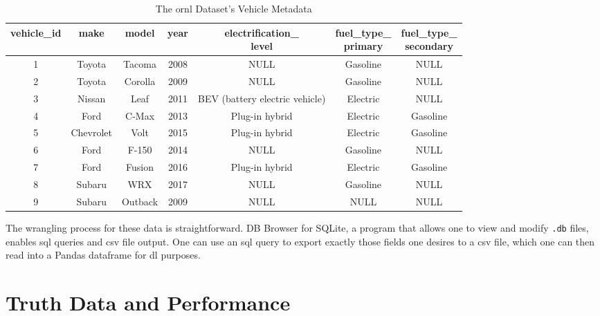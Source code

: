 \documentclass[11pt]{article}
\begin{document}
\begin{table}
    \caption{The \ac{ornl} Dataset's Vehicle Metadata}
    \centering
    \label{tab:vehicles}
    \begin{tabular}{|c|c|c|c|c|c|c|}
    \hline
    \textbf{vehicle\_id} & \textbf{make} & \textbf{model} & \textbf{year} & \makecell{\textbf{electrification\_} \\ \textbf{level}} & \makecell{\textbf{fuel\_type\_} \\ \textbf{primary}} & \makecell{\textbf{fuel\_type\_} \\ \textbf{secondary}} \\
    \hline
    1 & Toyota    & Tacoma  & 2008 & NULL                           & Gasoline & NULL     \\
    2 & Toyota    & Corolla & 2009 & NULL                           & Gasoline & NULL     \\
    3 & Nissan    & Leaf    & 2011 & BEV (battery electric vehicle) & Electric & NULL     \\
    4 & Ford      & C-Max   & 2013 & Plug-in hybrid                 & Electric & Gasoline \\
    5 & Chevrolet & Volt    & 2015 & Plug-in hybrid                 & Electric & Gasoline \\
    6 & Ford      & F-150   & 2014 & NULL                           & Gasoline & NULL     \\
    7 & Ford      & Fusion  & 2016 & Plug-in hybrid                 & Electric & Gasoline \\
    8 & Subaru    & WRX     & 2017 & NULL                           & Gasoline & NULL     \\
    9 & Subaru    & Outback & 2009 & NULL                           & NULL     & NULL     \\
    \hline
    \end{tabular}
\end{table}

The wrangling process for these data is straightforward. DB Browser for SQLite, a program that allows one to view and modify \texttt{.db} files, enables \ac{sql} queries and \ac{csv} file output. One can use an \ac{sql} query to export exactly those fields one desires to a \ac{csv} file, which one can then read into a Pandas dataframe for \ac{dl} purposes.

\section{Truth Data and Performance}
\end{document}
